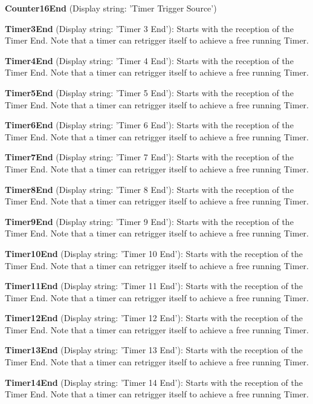 \begin{DoxyItemize}
\item {\bfseries Counter16\+End} (Display string\+: 'Timer Trigger Source')
\item {\bfseries Timer3\+End} (Display string\+: 'Timer 3 End')\+: Starts with the reception of the Timer End. Note that a timer can retrigger itself to achieve a free running Timer.
\item {\bfseries Timer4\+End} (Display string\+: 'Timer 4 End')\+: Starts with the reception of the Timer End. Note that a timer can retrigger itself to achieve a free running Timer.
\item {\bfseries Timer5\+End} (Display string\+: 'Timer 5 End')\+: Starts with the reception of the Timer End. Note that a timer can retrigger itself to achieve a free running Timer.
\item {\bfseries Timer6\+End} (Display string\+: 'Timer 6 End')\+: Starts with the reception of the Timer End. Note that a timer can retrigger itself to achieve a free running Timer.
\item {\bfseries Timer7\+End} (Display string\+: 'Timer 7 End')\+: Starts with the reception of the Timer End. Note that a timer can retrigger itself to achieve a free running Timer.
\item {\bfseries Timer8\+End} (Display string\+: 'Timer 8 End')\+: Starts with the reception of the Timer End. Note that a timer can retrigger itself to achieve a free running Timer.
\item {\bfseries Timer9\+End} (Display string\+: 'Timer 9 End')\+: Starts with the reception of the Timer End. Note that a timer can retrigger itself to achieve a free running Timer.
\item {\bfseries Timer10\+End} (Display string\+: 'Timer 10 End')\+: Starts with the reception of the Timer End. Note that a timer can retrigger itself to achieve a free running Timer.
\item {\bfseries Timer11\+End} (Display string\+: 'Timer 11 End')\+: Starts with the reception of the Timer End. Note that a timer can retrigger itself to achieve a free running Timer.
\item {\bfseries Timer12\+End} (Display string\+: 'Timer 12 End')\+: Starts with the reception of the Timer End. Note that a timer can retrigger itself to achieve a free running Timer.
\item {\bfseries Timer13\+End} (Display string\+: 'Timer 13 End')\+: Starts with the reception of the Timer End. Note that a timer can retrigger itself to achieve a free running Timer.
\item {\bfseries Timer14\+End} (Display string\+: 'Timer 14 End')\+: Starts with the reception of the Timer End. Note that a timer can retrigger itself to achieve a free running Timer.

\end{DoxyItemize}
